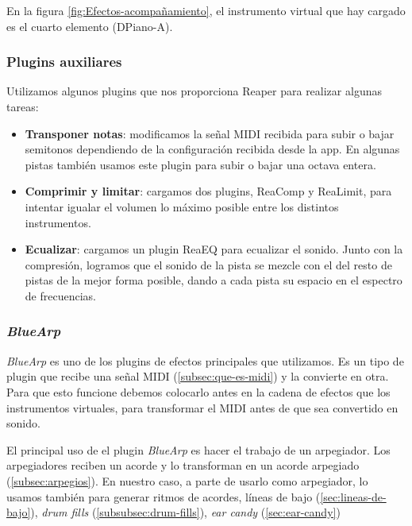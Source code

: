 En la figura \ref{fig:Efectos-acompañamiento}, el instrumento virtual que hay cargado es el cuarto elemento (DPiano-A).

\subsubsection{Plugins auxiliares}\label{subsubsec:bluearp}
Utilizamos algunos plugins que nos proporciona Reaper para realizar algunas tareas:

\begin{itemize}
    \item \textbf{Transponer notas}: modificamos la señal MIDI recibida para subir o bajar semitonos dependiendo de la configuración recibida desde la app. En algunas pistas también usamos este plugin para subir o bajar una octava entera.

    \item \textbf{Comprimir y limitar}: cargamos dos plugins, ReaComp y ReaLimit, para intentar igualar el volumen lo máximo posible entre los distintos instrumentos.
    
    \item \textbf{Ecualizar}: cargamos un plugin ReaEQ para ecualizar el sonido. Junto con la compresión, logramos que el sonido de la pista se mezcle con el del resto de pistas de la mejor forma posible, dando a cada pista su espacio en el espectro de frecuencias.  
    
\end{itemize}



    \subsubsection{\textit{BlueArp}}\label{subsubsec:bluearp}
\textit{BlueArp} es uno de los plugins de efectos principales que utilizamos. Es un tipo de plugin que recibe una señal MIDI (\ref{subsec:que-es-midi}) y la convierte en otra. Para que esto funcione debemos colocarlo antes en la cadena de efectos que los instrumentos virtuales, para transformar el MIDI antes de que sea convertido en sonido.

El principal uso de el plugin \textit{BlueArp} es hacer el trabajo de un arpegiador. Los arpegiadores reciben un acorde y lo transforman en un acorde arpegiado (\ref{subsec:arpegios}). En nuestro caso, a parte de usarlo como arpegiador, lo usamos también para generar ritmos de acordes, líneas de bajo (\ref{sec:lineas-de-bajo}), \textit{drum fills} (\ref{subsubsec:drum-fills}), \textit{ear candy} (\ref{sec:ear-candy})

